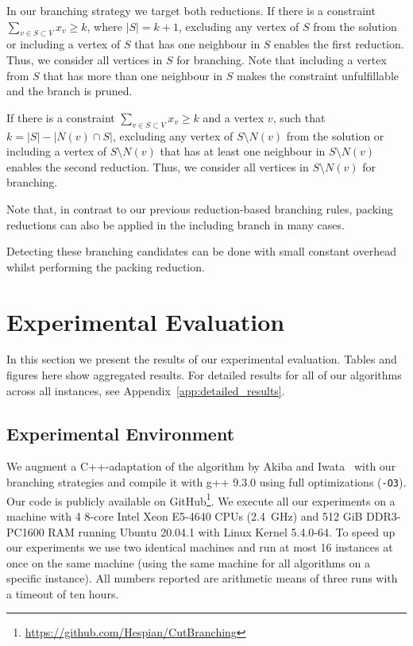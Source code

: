 \documentclass[a4paper,UKenglish,cleveref, autoref, thm-restate]{lipics-v2021}
\begin{document}
In our branching strategy we target both reductions. If there is a constraint $\sum_{v\in S\subset V}x_v\geq k$, where $|S| = k + 1$, excluding any vertex of $S$ from the solution or including a vertex of $S$ that has one neighbour in $S$ enables the first reduction. Thus, we consider all vertices in $S$ for branching. Note that including a vertex from $S$ that has more than one neighbour in $S$ makes the constraint unfulfillable and the branch is pruned.

If there is a constraint $\sum_{v\in S\subset V}x_v\geq k$ and a vertex $v$, such that $k = |S|-|N(v)\cap S|$, excluding any vertex of $S\setminus N(v)$ from the solution or including a vertex of $S\setminus N(v)$ that has at least one neighbour in $S\setminus N(v)$ enables the second reduction. Thus, we consider all vertices in $S\setminus N(v)$ for branching.

Note that, in contrast to our previous reduction-based branching rules, packing
reductions can also be applied in the including branch in many cases.

Detecting these branching candidates can be done with small constant overhead whilst performing the packing reduction.


\section{Experimental Evaluation}

In this section we present the results of our experimental evaluation. Tables
and figures here show aggregated results. For
detailed results for all of our algorithms across all instances, see Appendix~\ref{app:detailed_results}.

\subsection{Experimental Environment}
We augment a C++-adaptation of the algorithm by Akiba and
Iwata~\cite{AkibaIwata} with our branching strategies and compile it
with g++ 9.3.0 using full optimizations (\texttt{-O3}). Our
code is publicly available on GitHub\footnote{\url{https://github.com/Hespian/CutBranching}}. We execute all our experiments on a machine with 4 8-core Intel Xeon E5-4640 CPUs
(2.4~GHz) and 512 GiB DDR3-PC1600 RAM running Ubuntu 20.04.1 with Linux Kernel 5.4.0-64. To speed up our experiments we use two
identical machines and run at most 16 instances at once on the
same machine (using the same machine for all algorithms on a specific instance).
All numbers reported are arithmetic means of three runs with a timeout of ten
hours.
\end{document}
